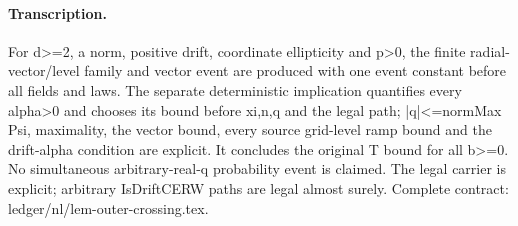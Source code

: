 \paragraph{Transcription.}
For d>=2, a norm, positive drift, coordinate ellipticity and p>0, the finite radial-vector/level family and vector event are produced with one event constant before all fields and laws. The separate deterministic implication quantifies every alpha>0 and chooses its bound before xi,n,q and the legal path; |q|<=normMax Psi, maximality, the vector bound, every source grid-level ramp bound and the drift-alpha condition are explicit. It concludes the original T bound for all b>=0. No simultaneous arbitrary-real-q probability event is claimed. The legal carrier is explicit; arbitrary IsDriftCERW paths are legal almost surely. Complete contract: ledger/nl/lem-outer-crossing.tex.
